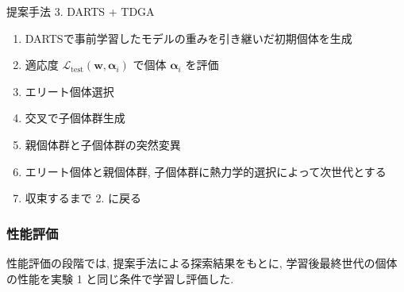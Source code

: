 \begin{algorithm}[tb]
  \caption{提案手法 3. DARTS + TDGA}
  \label{alg3}
  \begin{enumerate}
    \item DARTSで事前学習したモデルの重みを引き継いだ初期個体を生成
    \item 適応度 $\displaystyle \mathcal{L}_{\mathrm{test}}(\bm{w}, \bm{\alpha}_i)$ で個体 $\bm{\alpha}_i$ を評価
    \item エリート個体選択
    \item 交叉で子個体群生成
    \item 親個体群と子個体群の突然変異
    \item エリート個体と親個体群, 子個体群に熱力学的選択によって次世代とする
    \item 収束するまで 2. に戻る
  \end{enumerate}
\end{algorithm}




\subsubsection{性能評価}

性能評価の段階では, 提案手法による探索結果をもとに,
学習後最終世代の個体の性能を実験 1 と同じ条件で学習し評価した.
